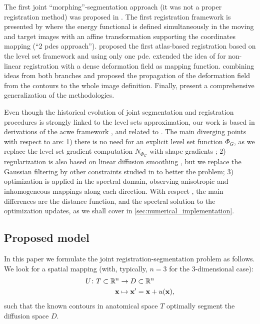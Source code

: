 The first joint ``morphing''-segmentation approach (it was not a proper
registration method) was proposed in \citep{bertalmio_morphing_2000}. The first
registration framework is presented by \citep{yezzi_variational_2001} where the
energy functional is defined simultaneously in the moving and target images with
an affine transformation supporting the coordinates mapping (``2 \glspl*{pde} approach'').
\citep{vemuri_joint_2003} proposed the first atlas-based registration based on the
level set framework and using only one \gls*{pde}. \citep{unal_coupled_2005} extended the
idea of \citep{bertalmio_morphing_2000,yezzi_variational_2001} for non-linear
registration with a dense deformation field as mapping function. \citep{droske_mumfordshah_2009}
combining ideas from both branches and proposed the propagation of the
deformation field from the contours to the whole image definition. Finally,
\citep{gorthi_active_2011} present a comprehensive generalization of the methodologies.

Even though the historical evolution
of joint segmentation and registration procedures is strongly linked
to the level sets approximation, our work is based in derivations of
the \gls{acwe} framework \citep{chan_active_2001}, and related to
\citep{guyader_combined_2011}.
{\color{red} {The main diverging points with respect to
\citep{gorthi_active_2011} are: 1) there is no need for an explicit level set function
$\Phi_G$, as we replace the level set gradient computation $N_{\Phi_G}$ with shape
gradients \citep{besson_dream2s_2003,herbulot_segmentation_2006};
2) regularization is also based on linear diffusion smoothing \citep{thirion_image_1998},
but we replace the Gaussian filtering by other constraints
studied in \citep{nagel_investigation_1986} to better the problem;
3) optimization is applied in the spectral
domain, observing anisotropic and inhomogeneous mappings along each direction.
With respect \citep{guyader_combined_2011}, the main differences are
the distance function, and the spectral solution to the optimization updates,
as we shall cover in \autoref{sec:numerical_implementation}.}}



\subsection{Proposed model}
\label{sec:methods_map}
In this paper we formulate the joint registration-segmentation
problem as follows. We look for a spatial mapping (with, typically,
$n=3$ for the 3-dimensional case):
\begin{align}
U\colon T \subset \mathbb{R}^n &\to D \subset \mathbb{R}^n \notag\\
\vec{x} &\mapsto \vec{x}' =\vec{x}+u(\vec{x}),
\label{eq:deformation_field}
\end{align}
such that the known contours in anatomical space $T$ optimally segment
the diffusion space $D$.

